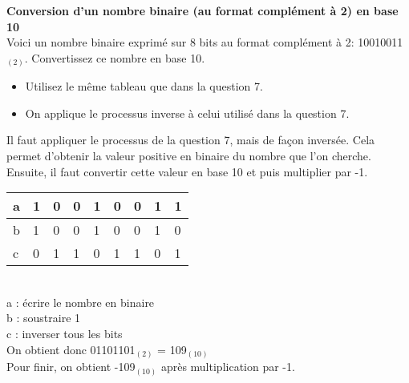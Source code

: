\begin{Exercice}[5 minutes] \textbf{Conversion d'un nombre binaire (au format complément à 2) en base 10}\\
    
    Voici un nombre binaire exprimé sur 8 bits au format complément à 2: 10010011$_{(2)}$. Convertissez ce nombre en base 10. \\
	
    \begin{conseil}
    
    \begin{itemize}
    	\item Utilisez le même tableau que dans la question 7.
    	\item On applique le processus inverse à celui utilisé dans la question 7. 
    \end{itemize}
    
    \end{conseil}
    
    \begin{solution}
       Il faut appliquer le processus de la question 7, mais de façon inversée. Cela permet d'obtenir la valeur positive en binaire du nombre que l'on cherche. Ensuite, il faut convertir cette valeur en base 10 et puis multiplier par -1. \\
       
       \begin{tabular}{| p{1cm} | p{1cm} | p{1cm} | p{1cm} | p{1cm} | p{1cm} | p{1cm} | p{1cm} | p{1cm} |} 
            \hline
            a & 1 & 0 & 0 & 1 & 0 & 0 & 1 & 1 \\ [0.5ex] 
            \hline
            b & 1 & 0 & 0 & 1 & 0 & 0 & 1 & 0 \\ [0.5ex]
            \hline
            c & 0 & 1 & 1 & 0 & 1 & 1 & 0 & 1 \\ [0.5ex]
            \hline
        \end{tabular} \\
        
        a : écrire le nombre en binaire \\
        
        b : soustraire 1 \\
        
        c : inverser tous les bits \\
        
        On obtient donc 01101101$_{(2)}$ = 109$_{(10)}$ \\
        
        Pour finir, on obtient -109$_{(10)}$ après multiplication par -1.
       
    \end{solution}
\end{Exercice}

